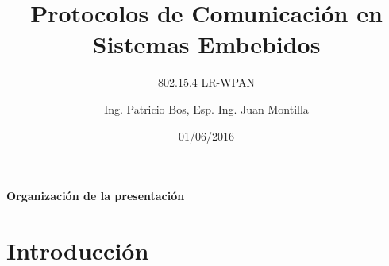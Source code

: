 \documentclass[aspectratio=169]{beamer}
\title[802.15.4 LR-WPAN]{Protocolos de Comunicación en Sistemas Embebidos}
\subtitle{802.15.4 LR-WPAN}
\author[]{Ing. Patricio Bos, Esp. Ing. Juan Montilla}
\institute[CESE-FIUBA]{Carrera de Especialización en Sistemas Embebidos - FIUBA}
\date{01/06/2016}
\begin{document}
\begingroup
\makeatletter
\setlength{\hoffset}{-.5\beamer@sidebarwidth}
\makeatother
\begin{frame}
  \titlepage
\end{frame}

\endgroup



\begin{frame}{\textbf{Organización de la presentación}}
  \tableofcontents
\end{frame}
%
%
%
\section{Introducción}
\end{document}
